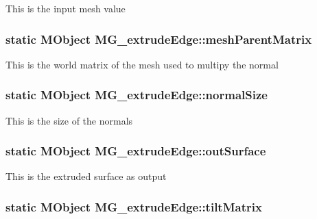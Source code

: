 This is the input mesh value \hypertarget{class_m_g__extrude_edge_a907b882e00ddf5cc7edc6b49fb9a7d60}{
\subsubsection[{mesh\-Parent\-Matrix}]{\setlength{\rightskip}{0pt plus 5cm}static M\-Object M\-G\-\_\-extrude\-Edge\-::mesh\-Parent\-Matrix\hspace{0.3cm}{\ttfamily [static]}}}\label{class_m_g__extrude_edge_a907b882e00ddf5cc7edc6b49fb9a7d60}
This is the world matrix of the mesh used to multipy the normal \hypertarget{class_m_g__extrude_edge_a157ab849f390de93e28105e717941c8f}{
\subsubsection[{normal\-Size}]{\setlength{\rightskip}{0pt plus 5cm}static M\-Object M\-G\-\_\-extrude\-Edge\-::normal\-Size\hspace{0.3cm}{\ttfamily [static]}}}\label{class_m_g__extrude_edge_a157ab849f390de93e28105e717941c8f}
This is the size of the normals \hypertarget{class_m_g__extrude_edge_a4f81064a39824fb7ea6b8e4d0afcd2d6}{
\subsubsection[{out\-Surface}]{\setlength{\rightskip}{0pt plus 5cm}static M\-Object M\-G\-\_\-extrude\-Edge\-::out\-Surface\hspace{0.3cm}{\ttfamily [static]}}}\label{class_m_g__extrude_edge_a4f81064a39824fb7ea6b8e4d0afcd2d6}
This is the extruded surface as output \hypertarget{class_m_g__extrude_edge_a2a1366099fa1e1ddd4c0a6f13d449b90}{
\subsubsection[{tilt\-Matrix}]{\setlength{\rightskip}{0pt plus 5cm}static M\-Object M\-G\-\_\-extrude\-Edge\-::tilt\-Matrix\hspace{0.3cm}{\ttfamily [static]}}}\label{class_m_g__extrude_edge_a2a1366099fa1e1ddd4c0a6f13d449b90}
